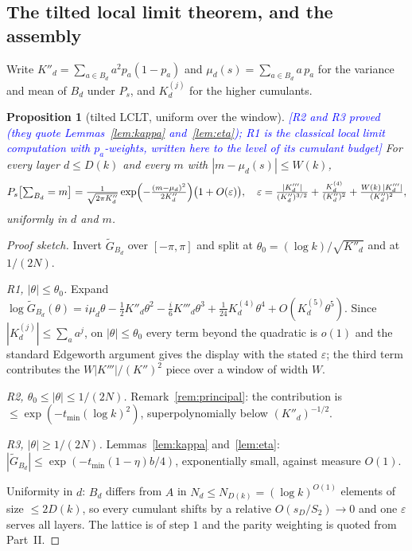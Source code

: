 \documentclass[11pt,a4paper]{article}
\theoremstyle{plain}
\newtheorem{proposition}[theorem]{Proposition}
\theoremstyle{definition}
\theoremstyle{remark}
\newcommand{\STATUS}[1]{\textcolor{blue}{\textsf{[#1]}}}
\begin{document}
\subsection{The tilted local limit theorem, and the assembly}\label{sec:p3}

Write $K''_d=\sum_{a\in B_d}a^{2}p_a(1-p_a)$ and $\mu_d(s)=\sum_{a\in B_d}a\,p_a$ for the
variance and mean of $B_d$ under $P_s$, and $K^{(j)}_d$ for the higher cumulants.

\begin{proposition}[tilted LCLT, uniform over the window]\label{prop:tiltlclt}
\STATUS{R2 and R3 proved (they quote Lemmas~\ref{lem:kappa} and~\ref{lem:eta}); R1 is the
classical local limit computation with $p_a$-weights, written here to the level of its
cumulant budget}
For every layer $d\le D(k)$ and every $m$ with $|m-\mu_d(s)|\le W(k)$,
\[
  P_s\bigl[\textstyle\sum_{B_d}=m\bigr]
  =\frac{1}{\sqrt{2\pi K''_d}}\exp\Bigl(-\frac{(m-\mu_d)^{2}}{2K''_d}\Bigr)\bigl(1+O(\varepsilon)\bigr),
  \quad
  \varepsilon=\frac{|K'''_d|}{(K''_d)^{3/2}}+\frac{K^{(4)}_d}{(K''_d)^{2}}
     +\frac{W(k)\,|K'''_d|}{(K''_d)^{2}},
\]
uniformly in $d$ and $m$.
\end{proposition}

\begin{proof}[Proof sketch]
Invert $\widetilde G_{B_d}$ over $[-\pi,\pi]$ and split at
$\theta_0=(\log k)/\sqrt{K''_d}$ and at $1/(2N)$.

\emph{R1, $|\theta|\le\theta_0$.} Expand
$\log\widetilde G_{B_d}(\theta)=i\mu_d\theta-\tfrac12K''_d\theta^{2}
-\tfrac{i}{6}K'''_d\theta^{3}+\tfrac1{24}K^{(4)}_d\theta^{4}+O(K^{(5)}_d\theta^{5})$.
Since $|K^{(j)}_d|\le\sum_{a}a^{j}$, on $|\theta|\le\theta_0$ every term beyond the quadratic
is $o(1)$ and the standard Edgeworth argument gives the display with the stated $\varepsilon$;
the third term contributes the $W|K'''|/(K'')^{2}$ piece over a window of width $W$.

\emph{R2, $\theta_0\le|\theta|\le1/(2N)$.} Remark~\ref{rem:principal}: the contribution is
$\le\exp(-t_{\min}(\log k)^{2})$, superpolynomially below $(K''_d)^{-1/2}$.

\emph{R3, $|\theta|\ge1/(2N)$.} Lemmas~\ref{lem:kappa} and~\ref{lem:eta}:
$|\widetilde G_{B_d}|\le\exp(-t_{\min}(1-\eta)b/4)$, exponentially small, against measure
$O(1)$.

Uniformity in $d$: $B_d$ differs from $A$ in $N_d\le N_{D(k)}=(\log k)^{O(1)}$ elements of size
$\le2D(k)$, so every cumulant shifts by a relative $O(s_{D}/S_2)\to0$ and one $\varepsilon$
serves all layers. The lattice is of step $1$ and the parity weighting is quoted from Part~II.
\end{proof}
\end{document}
